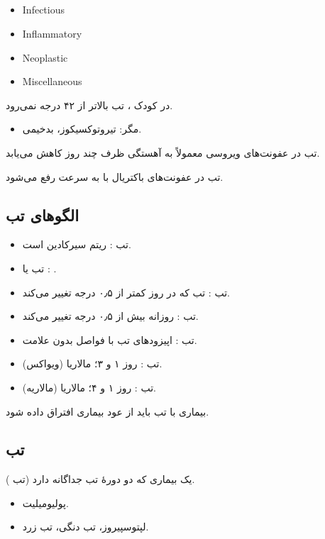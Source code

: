 \documentclass[12pt,a4paper]{article}
\begin{document}
\subsection*{}
\begin{latin}
\begin{itemize}
\item Infectious
\item Inflammatory
\item Neoplastic
\item Miscellaneous
\end{itemize}
\end{latin}

در کودک ، تب بالاتر از ۴۲ درجه نمی‌رود.
\begin{itemize}
\item مگر: تیروتوکسیکوز، بدخیمی.
\end{itemize}

تب در عفونت‌های ویروسی معمولاً به آهستگی ظرف چند روز کاهش می‌یابد.

تب در عفونت‌های باکتریال با  به سرعت رفع می‌شود.

\subsection*{الگوهای تب}
\begin{itemize}
\item تب : ریتم سیرکادین  است.
\item تب  یا : .
\item تب : تب  که در روز کمتر از ۰٫۵ درجه تغییر می‌کند.
\item تب : روزانه بیش از ۰٫۵ درجه تغییر می‌کند.
\item تب : اپیزودهای تب با فواصل بدون علامت.
\item تب : روز ۱ و ۳؛ مالاریا (ویواکس).
\item تب : روز ۱ و ۴؛ مالاریا (مالاریه).
\end{itemize}

بیماری با تب  باید از عود بیماری افتراق داده شود.

\subsection*{تب }
یک بیماری که دو دورهٔ تب جداگانه دارد (تب ).
\begin{itemize}
\item پولیومیلیت.
\item لپتوسپیروز، تب دنگی، تب زرد.
\end{itemize}
\end{document}
